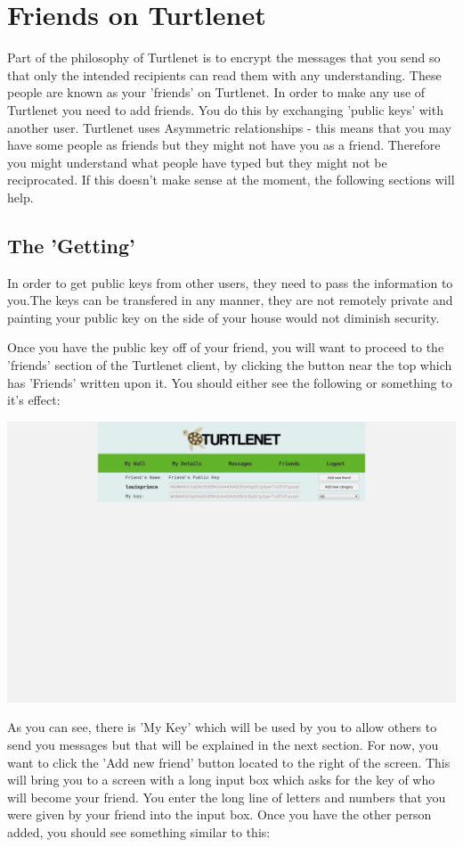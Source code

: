 \pagebreak
\section{Friends on Turtlenet}
Part of the philosophy of Turtlenet is to encrypt the messages that you send so
that only the intended recipients can read them with any understanding. These
people are known as your 'friends' on Turtlenet. In order to make any use of
Turtlenet you need to add friends. You do this by exchanging 'public keys' with
another user. Turtlenet uses Asymmetric relationships - this means that you may
have some people as friends but they might not have you as a friend. Therefore
you might understand what people have typed but they might not be reciprocated.
If this doesn't make sense at the moment, the following sections will help.

\subsection{The 'Getting'}
In order to get public keys from other users, they need to pass the information
to you.The keys can be transfered in any manner, they are not remotely private
and painting your public key on the side of your house would not diminish
security.

Once you have the public key off of your friend, you will want to proceed to the
'friends' section of the Turtlenet client, by clicking the button near the top
which has 'Friends' written upon it. You should either see the following or
something to it's effect:

\includegraphics[scale=0.2]{screenshots/Screenshot from 2014-04-29 22-31-10}

As you can see, there is 'My Key' which will be used by you to allow others to
send you messages but that will be explained in the next section. For now, you
want to click the 'Add new friend' button located to the right of the screen.
This will bring you to a screen with a long input box which asks for the key of
who will become your friend. You enter the long line of letters and numbers
that you were given by your friend into the input box. Once you have the other
person added, you should see something similar to this:

